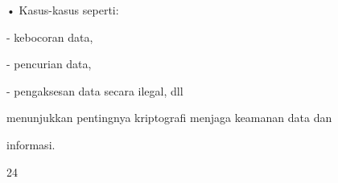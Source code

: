 \documentclass{article}
\begin{document}

• Kasus-kasus seperti:

    - kebocoran data,

    - pencurian data, 

    - pengaksesan data secara ilegal, dll 

   menunjukkan pentingnya kriptografi menjaga keamanan data dan 

informasi.

24
\end{document}
